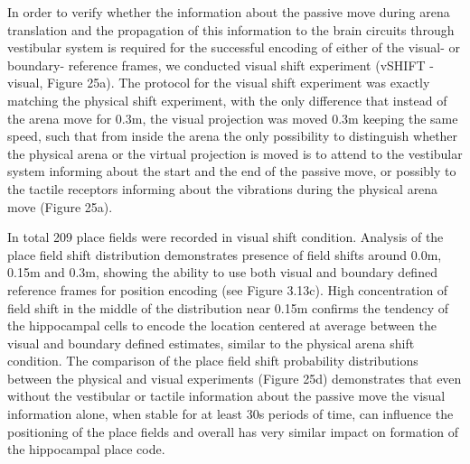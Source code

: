 In order to verify whether the information about the passive move during arena translation and the propagation of this information to the brain circuits through vestibular system is required for the successful encoding of either of the visual- or boundary- reference frames, we conducted visual shift experiment (vSHIFT - visual, Figure 25a). The protocol for the visual shift experiment was exactly matching the physical shift experiment, with the only difference that instead of the arena move for 0.3m, the visual projection was moved 0.3m keeping the same speed, such that from inside the arena the only possibility to distinguish whether the physical arena or the virtual projection is moved is to attend to the vestibular system informing about the start and the end of the passive move, or possibly to the tactile receptors informing about the vibrations during the physical arena move (Figure 25a).

In total 209 place fields were recorded in visual shift condition. Analysis of the place field shift distribution demonstrates presence of field shifts around 0.0m, 0.15m and 0.3m, showing the ability to use both visual and boundary defined reference frames for position encoding (see Figure 3.13c). High concentration of field shift in the middle of the distribution near 0.15m confirms the tendency of the hippocampal cells to encode the location centered at average between the visual and boundary defined estimates, similar to the physical arena shift condition. The comparison of the place field shift probability distributions between the physical and visual experiments (Figure 25d) demonstrates that even without the vestibular or tactile information about the passive move the visual information alone, when stable for at least 30s periods of time, can influence the positioning of the place fields and overall has very similar impact on formation of the hippocampal place code.

